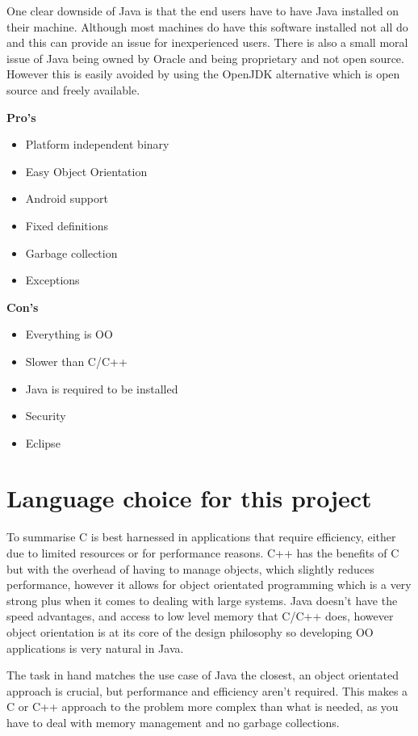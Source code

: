 \documentclass[10pt]{article}
\begin{document}
  One clear downside of Java is that the end users have to have Java installed on their machine. Although most machines do have this software installed not all do and this can provide an issue for inexperienced users. There is also a small moral issue of Java being owned by Oracle and being proprietary and not open source. However this is easily avoided by using the OpenJDK alternative which is open source and freely available.

  \begin{multicols}{2}
  \textbf{Pro's}
  \begin{itemize}
    \item Platform independent binary
    \item Easy Object Orientation
    \item Android support
    \item Fixed definitions
    \item Garbage collection
    \item Exceptions
  \end{itemize}

  \textbf{Con's}
  \begin{itemize}
    \item Everything is OO
    \item Slower than C/C++
    \item Java is required to be installed
    \item Security
    \item Eclipse
  \end{itemize}
  \end{multicols}

  \section{Language choice for this project}
  To summarise C is best harnessed in applications that require efficiency, either due to limited resources or for performance reasons. C++ has the benefits of C but with the overhead of having to manage objects, which slightly reduces performance, however it allows for object orientated programming which is a very strong plus when it comes to dealing with large systems. Java doesn't have the speed advantages, and access to low level memory that C/C++ does, however object orientation is at its core of the design philosophy so developing OO applications is very natural in Java. 

  The task in hand matches the use case of Java the closest, an object orientated approach is crucial, but performance and efficiency aren't required. This makes a C or C++ approach to the problem more complex than what is needed, as you have to deal with memory management and no garbage collections.
\end{document}
